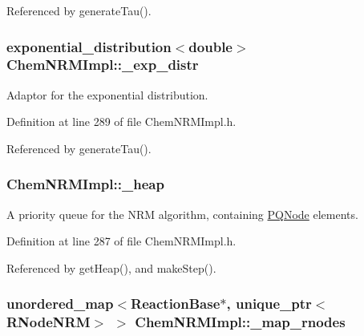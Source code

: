 Referenced by generate\+Tau().

\hypertarget{classChemNRMImpl_af0e23969dfefcde35cf878c15e950300}{
\subsubsection[{\+\_\+exp\+\_\+distr}]{\setlength{\rightskip}{0pt plus 5cm}exponential\+\_\+distribution$<$double$>$ Chem\+N\+R\+M\+Impl\+::\+\_\+exp\+\_\+distr\hspace{0.3cm}{\ttfamily [private]}}}\label{classChemNRMImpl_af0e23969dfefcde35cf878c15e950300}


Adaptor for the exponential distribution. 



Definition at line 289 of file Chem\+N\+R\+M\+Impl.\+h.



Referenced by generate\+Tau().

\hypertarget{classChemNRMImpl_aae97d56d3951afd82e9d017762eeec62}{
\subsubsection[{\+\_\+heap}]{ Chem\+N\+R\+M\+Impl\+::\+\_\+heap\hspace{0.3cm}{\ttfamily [private]}}}\label{classChemNRMImpl_aae97d56d3951afd82e9d017762eeec62}


A priority queue for the N\+R\+M algorithm, containing \hyperlink{classPQNode}{P\+Q\+Node} elements. 



Definition at line 287 of file Chem\+N\+R\+M\+Impl.\+h.



Referenced by get\+Heap(), and make\+Step().

\hypertarget{classChemNRMImpl_a187b7d9676fc00d2e9aa59a26db1adb0}{
\subsubsection[{\+\_\+map\+\_\+rnodes}]{\setlength{\rightskip}{0pt plus 5cm}unordered\+\_\+map$<${\bf Reaction\+Base}$\ast$, unique\+\_\+ptr$<${\bf R\+Node\+N\+R\+M}$>$ $>$ Chem\+N\+R\+M\+Impl\+::\+\_\+map\+\_\+rnodes\hspace{0.3cm}{\ttfamily [private]}}}\label{classChemNRMImpl_a187b7d9676fc00d2e9aa59a26db1adb0}


